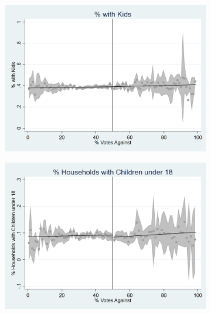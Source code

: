 \begin{figure}[ht]
    \vspace{1em}

    \begin{minipage}[b]{0.48\textwidth}
        \centering
        \begin{subfigure}[b]{\textwidth}
            \centering
            \includegraphics[width=\textwidth,keepaspectratio]{images/cov_smoothness_pctwithkids.png}
            \label{fig:pct_with_kids_sm}
        \end{subfigure}
    \end{minipage}
    \hfill
    \begin{minipage}[b]{0.48\textwidth}
        \centering
        \begin{subfigure}[b]{\textwidth}
            \centering
            \includegraphics[width=\textwidth,keepaspectratio]{images/cov_smoothness_pctsinparhhld.png}
            \label{fig:pctsinparhhld_sm}
        \end{subfigure}
    \end{minipage}


\end{figure}
